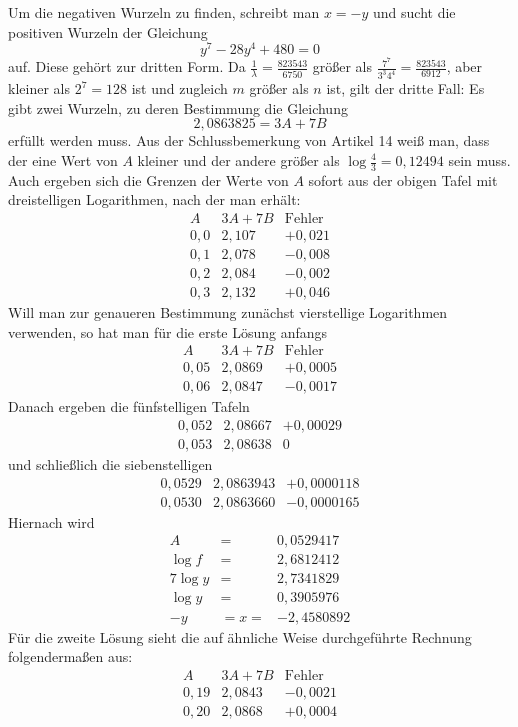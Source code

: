 Um die negativen Wurzeln zu finden, schreibt man $x=-y$ und sucht die positiven Wurzeln der Gleichung
\[
y^{7}-28y^{4}+480=0
\]
auf. Diese gehört zur dritten Form. Da $\frac{1}{\lambda}=\frac{823543}{6750}$ größer als $\frac{7^{7}}{3^{3}4^{4}}=\frac{823543}{6912}$, aber kleiner als $2^{7}=128$ ist und zugleich $m$ größer als $n$ ist, gilt der dritte Fall: Es gibt zwei Wurzeln, zu deren Bestimmung die Gleichung
\[
2{,}0863825=3A+7B
\]
erfüllt werden muss. Aus der Schlussbemerkung von Artikel 14 weiß man, dass der eine Wert von $A$ kleiner und der andere größer als $\log\frac{4}{3}=0{,}12494$ sein muss. Auch ergeben sich die Grenzen der Werte von $A$ sofort aus der obigen Tafel mit dreistelligen Logarithmen, nach der man erhält:
\[
\begin{array}{c|c|r}
A&3A+7B&\mbox{Fehler}\\ \hline
0{,}0&2{,}107&+0{,}021\\
0{,}1&2{,}078&-0{,}008\\
0{,}2&2{,}084&-0{,}002\\
0{,}3&2{,}132&+0{,}046
\end{array}
\]
Will man zur genaueren Bestimmung zunächst vierstellige Logarithmen verwenden, so hat man für die erste Lösung anfangs
\[
\begin{array}{r|r|r}
A&3A+7B&\mathrm{Fehler}\\\hline
0{,}05&2{,}0869&+0{,}0005\\
0{,}06&2{,}0847&-0{,}0017
\end{array}
\]
Danach ergeben die fünfstelligen Tafeln
\[
\begin{array}{r|r|r}
0{,}052&2{,}08667&+0{,}00029\\
0{,}053&2{,}08638&0
\end{array}
\]
und schließlich die siebenstelligen
\[
\begin{array}{r|r|r}
0{,}0529&2{,}0863943&+0{,}0000118\\
0{,}0530&2{,}0863660&-0{,}0000165
\end{array}
\]
Hiernach wird
\[
\begin{array}{rcl}
A&=&0{,}0529417\\
\log f&=&2{,}6812412\\
7\log y&=&2{,}7341829\\
\log y&=&0{,}3905976\\
-y&=x=&-2{,}4580892
\end{array}
\]
Für die zweite Lösung sieht die auf ähnliche Weise durchgeführte Rechnung folgendermaßen aus:
\[
\begin{array}{r|r|r}
A&3A+7B&\mathrm{Fehler}\\\hline
0{,}19&2{,}0843&-0{,}0021\\
0{,}20&2{,}0868&+0{,}0004
\end{array}
\]
